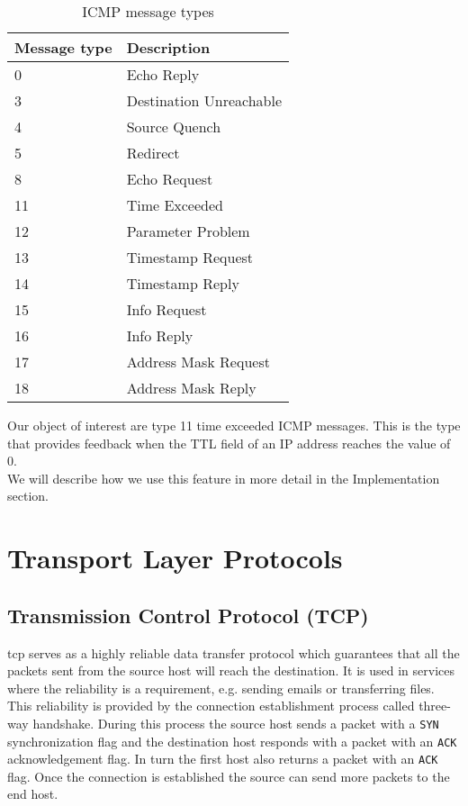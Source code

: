 \begin{table}[H]
\centering
\begin{tabular}{ | m{3cm} | m{5cm}| } 
  \hline
	Message type & Description \\
  \hline
    0 & Echo Reply  \\
    3 & Destination Unreachable \\
    4 & Source Quench \\
    5 & Redirect \\
    8 & Echo Request \\
    11 & Time Exceeded \\
    12 & Parameter Problem \\
    13 & Timestamp Request \\
    14 & Timestamp Reply \\
    15 & Info Request \\
    16 & Info Reply \\
    17 & Address Mask Request \\
    18 & Address Mask Reply \\ 
  \hline
\end{tabular}
\caption{ICMP message types \cite{icmp_man}}
\label{icmp_types}
\end{table}

Our object of interest are type 11 time exceeded ICMP messages. This is the type that provides feedback when the TTL field of an IP address reaches the value of 0.\\
We will describe how we use this feature in more detail in the Implementation section.

\section{Transport Layer Protocols}

\subsection{Transmission Control Protocol (TCP)}
\acl{tcp} serves as a highly reliable data transfer protocol which guarantees that all the packets sent from the source host will reach the destination. It is used in services where the reliability is a requirement, e.g. sending emails or transferring files.\\
This reliability is provided by the connection establishment process called three-way handshake. 
During this process the source host sends a packet with a \texttt{SYN} synchronization flag and the destination host responds with a packet with an \texttt{ACK} acknowledgement flag. In turn the first host also returns a packet with an \texttt{ACK} flag. Once the connection is established the source can send more packets to the end host. 

